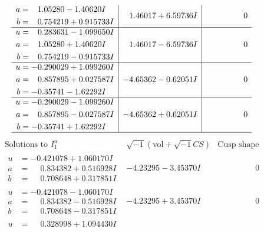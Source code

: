 \documentclass[1p]{elsarticle_modified}
\theoremstyle{definition}
\newcommand{\I}{\sqrt{-1}}
\begin{document}
$$\begin{array}{c|c|c}
\begin{aligned}
a &= \phantom{-}1.05280 - 1.40620 I \\
b &= \phantom{-}0.754219 + 0.915733 I\end{aligned}
 & \phantom{-}1.46017 + 6.59736 I & \phantom{-0.000000 } 0 \\ \hline\begin{aligned}
u &= \phantom{-}0.283631 - 1.099650 I \\
a &= \phantom{-}1.05280 + 1.40620 I \\
b &= \phantom{-}0.754219 - 0.915733 I\end{aligned}
 & \phantom{-}1.46017 - 6.59736 I & \phantom{-0.000000 } 0 \\ \hline\begin{aligned}
u &= -0.290029 + 1.099260 I \\
a &= \phantom{-}0.857895 + 0.027587 I \\
b &= -0.35741 - 1.62292 I\end{aligned}
 & -4.65362 - 0.62051 I & \phantom{-0.000000 } 0 \\ \hline\begin{aligned}
u &= -0.290029 - 1.099260 I \\
a &= \phantom{-}0.857895 - 0.027587 I \\
b &= -0.35741 + 1.62292 I\end{aligned}
 & -4.65362 + 0.62051 I & \phantom{-0.000000 } 0\\
 \hline 
 \end{array}$$\newpage$$\begin{array}{c|c|c}  
\text{Solutions to }I^u_{1}& \I (\text{vol} + \sqrt{-1}CS) & \text{Cusp shape}\\
 \hline 
\begin{aligned}
u &= -0.421078 + 1.060170 I \\
a &= \phantom{-}0.834382 + 0.516928 I \\
b &= \phantom{-}0.708648 + 0.317851 I\end{aligned}
 & -4.23295 - 3.45370 I & \phantom{-0.000000 } 0 \\ \hline\begin{aligned}
u &= -0.421078 - 1.060170 I \\
a &= \phantom{-}0.834382 - 0.516928 I \\
b &= \phantom{-}0.708648 - 0.317851 I\end{aligned}
 & -4.23295 + 3.45370 I & \phantom{-0.000000 } 0 \\ \hline\begin{aligned}
u &= \phantom{-}0.328998 + 1.094430 I \\

\end{aligned}
\end{array}$$
\end{document}

